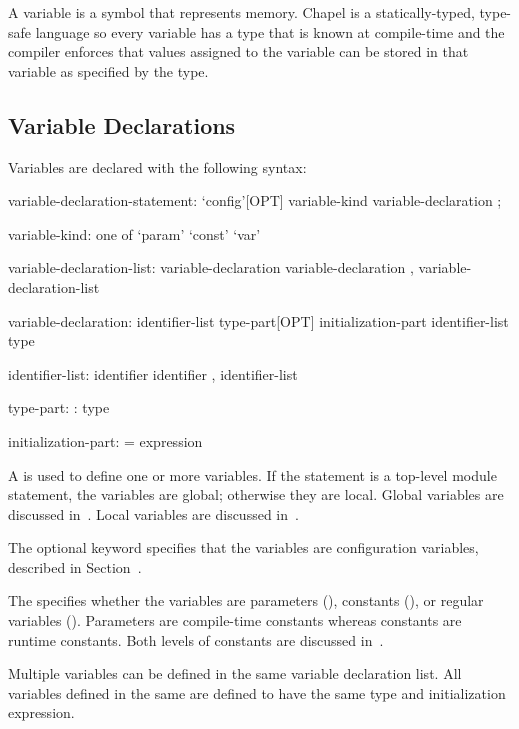 \label{Variables}

A variable is a symbol that represents memory.  Chapel is a
statically-typed, type-safe language so every variable has a type that
is known at compile-time and the compiler enforces that values
assigned to the variable can be stored in that variable as specified
by the type.

\subsection{Variable Declarations}
\label{Variable_Declarations}

Variables are declared with the following syntax:
\begin{syntax}
variable-declaration-statement:
  `config'[OPT] variable-kind variable-declaration ;

variable-kind: one of
  `param' `const' `var'

variable-declaration-list:
  variable-declaration
  variable-declaration , variable-declaration-list

variable-declaration:
  identifier-list type-part[OPT] initialization-part
  identifier-list type

identifier-list:
  identifier
  identifier , identifier-list

type-part:
  : type

initialization-part:
  = expression
\end{syntax}
A  is used to define one or more
variables.  If the statement is a top-level module statement, the
variables are global; otherwise they are local.  Global variables are
discussed in~.  Local variables are discussed
in~.

The optional keyword  specifies that the variables are
configuration variables, described in
Section~.

The  specifies whether the variables are
parameters (), constants (), or regular
variables ().  Parameters are compile-time constants whereas
constants are runtime constants.  Both levels of constants are
discussed in~.

Multiple variables can be defined in the same variable declaration
list.  All variables defined in the same  are
defined to have the same type and initialization expression.

